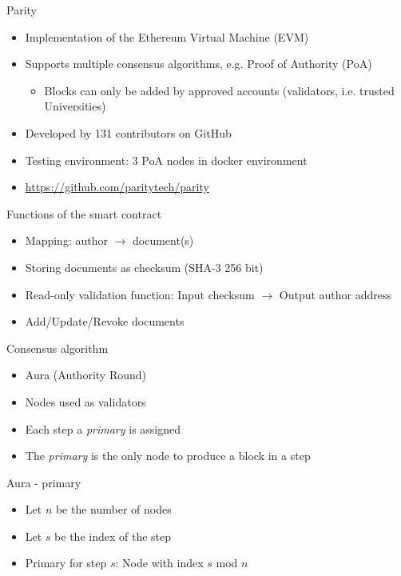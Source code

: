 \documentclass[10pt]{beamer}
\begin{document}
\begin{frame}{Parity}
	\begin{itemize}
		\item Implementation of the Ethereum Virtual Machine (EVM)
		\item Supports multiple consensus algorithms, e.g. Proof of Authority (PoA)
		\begin{itemize}
			\item Blocks can only be added by approved accounts (validators, i.e. trusted Universities)
		\end{itemize}
		\item Developed by 131 contributors on GitHub
		\item Testing environment: 3 PoA nodes in docker environment
		\item \url{https://github.com/paritytech/parity}
	\end{itemize}
\end{frame}

\begin{frame}{Functions of the smart contract}
	\begin{itemize}
		\item Mapping: author  $\rightarrow$ document(s)
		\item Storing documents as checksum (SHA-3 256 bit)
		\item Read-only validation function: Input checksum $\rightarrow$ Output author address
		\item Add/Update/Revoke documents
	\end{itemize}
\end{frame}

\begin{frame}{Consensus algorithm}
	\begin{itemize}
		\item Aura (Authority Round)
		\item Nodes used as validators
		\item Each step a \textit{primary} is assigned
		\item The \textit{primary} is the only node to produce a block in a step
	\end{itemize}
\end{frame}

\begin{frame}{Aura - primary}
	\begin{itemize}
		\item Let $n$ be the number of nodes
		\item Let $s$ be the index of the step
		\item Primary for step $s$: Node with index $s$ mod $n$
	\end{itemize}
\end{frame}
\end{document}
